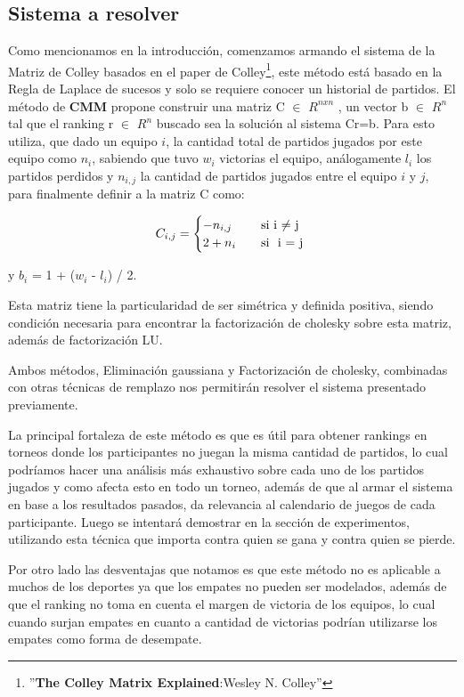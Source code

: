 \subsection{Sistema a resolver}

Como mencionamos en la introducción, comenzamos armando el sistema de la Matriz de Colley basados en el paper de Colley\footnote{''\textbf{The Colley Matrix Explained}:Wesley N. Colley''}, este método está basado en la Regla de Laplace de sucesos y solo se requiere conocer un historial de partidos. 
El método de \textbf{CMM} propone construir una matriz C $\in$ $ R^{nxn}$ , un vector b $\in$ $ R^n$ tal que el ranking r $\in$ $R^n$ buscado sea la solución al sistema Cr=b.
Para esto utiliza, que dado un equipo $i$, la cantidad total de partidos jugados por este equipo como $n_i$, sabiendo que tuvo $w_i$ victorias el equipo, análogamente $l_i$ los partidos perdidos y $n_{i,j}$ la cantidad de partidos jugados entre el equipo $i$ y $j$, para finalmente definir a la matriz C como: 

\[ C_{i,j} =
    \begin{cases}
        -n_{i,j}       & \quad \text{si }  \text{i $\neq$ j}\\
        2+n_i & \quad \text{si } \text{ i = j }\\
    \end{cases}
$$
  $$  \]
                    
y $b_i$ = 1 +  ($w_i$ - $l_i$) / 2.

Esta matriz tiene la particularidad de ser simétrica y definida positiva, siendo condición necesaria para encontrar la factorización de cholesky sobre esta matriz, además de factorización LU.

Ambos métodos, Eliminación gaussiana y Factorización de cholesky, combinadas con otras técnicas de remplazo nos permitirán resolver el sistema presentado previamente.

La principal fortaleza de este método es que es útil para obtener rankings en torneos donde los participantes no juegan la misma cantidad de partidos, lo cual 
podríamos hacer una análisis más exhaustivo sobre cada uno de los partidos jugados y como afecta esto en todo un torneo,
además de que al armar el sistema en base a los resultados pasados, da relevancia al calendario de juegos de cada participante. 
Luego se intentará demostrar en la sección de experimentos, utilizando esta técnica que importa contra quien se gana y contra quien se pierde.

Por otro lado las desventajas que notamos es que este método no es aplicable a muchos de los deportes ya que los empates no pueden ser modelados, además de que el ranking no toma en cuenta
el margen de victoria de los equipos, lo cual cuando surjan empates en cuanto a cantidad de victorias podrían utilizarse los empates como forma de desempate.

